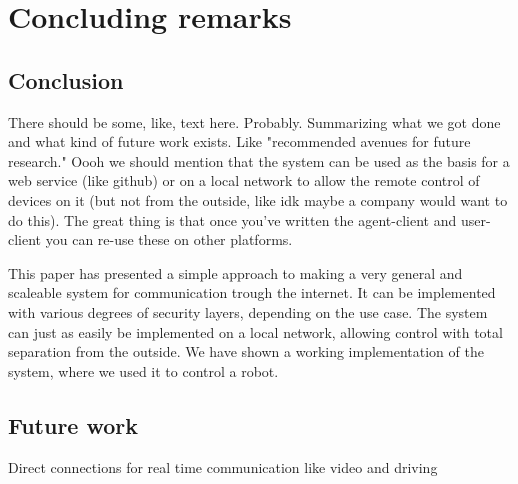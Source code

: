 \chapter{Concluding remarks}
\section{Conclusion}
There should be some, like, text here.
Probably.
Summarizing what we got done and what kind of future work exists.
Like "recommended avenues for future research."
Oooh we should mention that the system can be used as the basis for a web service (like github) or on a local network to allow the remote control of devices on it (but not from the outside, like idk maybe a company would want to do this).
The great thing is that once you've written the agent-client and user-client you can re-use these on other platforms.


This paper has presented a simple approach to making a very general and scaleable system for communication trough the internet.
It can be implemented with various degrees of security layers, depending on the use case.
The system can just as easily be implemented on a local network, allowing control with total separation from the outside. 
We have shown a working implementation of the system, where we used it to control a robot.

\section{Future work}

Direct connections for real time communication like video and driving

